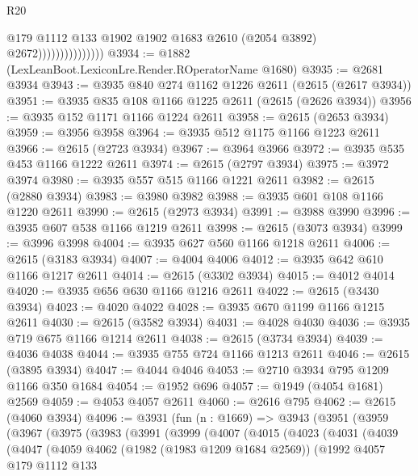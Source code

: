 \begin{lexlean}{R20}
\begin{coremodule}
                                  @179
                                  @1112
                                  @133
                                  @1902
                                  @1902
                                  @1683
                                  @2610
                                  (@2054 @3892)
                                  @2672)))))))))))))))
@3934 := @1882 (LexLeanBoot.LexiconLre.Render.ROperatorName @1680)
@3935 := @2681 @3934
@3943 := @3935 @840 @274 @1162 @1226 @2611 (@2615 (@2617 @3934))
@3951 := @3935 @835 @108 @1166 @1225 @2611 (@2615 (@2626 @3934))
@3956 := @3935 @152 @1171 @1166 @1224 @2611
@3958 := @2615 (@2653 @3934)
@3959 := @3956 @3958
@3964 := @3935 @512 @1175 @1166 @1223 @2611
@3966 := @2615 (@2723 @3934)
@3967 := @3964 @3966
@3972 := @3935 @535 @453 @1166 @1222 @2611
@3974 := @2615 (@2797 @3934)
@3975 := @3972 @3974
@3980 := @3935 @557 @515 @1166 @1221 @2611
@3982 := @2615 (@2880 @3934)
@3983 := @3980 @3982
@3988 := @3935 @601 @108 @1166 @1220 @2611
@3990 := @2615 (@2973 @3934)
@3991 := @3988 @3990
@3996 := @3935 @607 @538 @1166 @1219 @2611
@3998 := @2615 (@3073 @3934)
@3999 := @3996 @3998
@4004 := @3935 @627 @560 @1166 @1218 @2611
@4006 := @2615 (@3183 @3934)
@4007 := @4004 @4006
@4012 := @3935 @642 @610 @1166 @1217 @2611
@4014 := @2615 (@3302 @3934)
@4015 := @4012 @4014
@4020 := @3935 @656 @630 @1166 @1216 @2611
@4022 := @2615 (@3430 @3934)
@4023 := @4020 @4022
@4028 := @3935 @670 @1199 @1166 @1215 @2611
@4030 := @2615 (@3582 @3934)
@4031 := @4028 @4030
@4036 := @3935 @719 @675 @1166 @1214 @2611
@4038 := @2615 (@3734 @3934)
@4039 := @4036 @4038
@4044 := @3935 @755 @724 @1166 @1213 @2611
@4046 := @2615 (@3895 @3934)
@4047 := @4044 @4046
@4053 := @2710 @3934 @795 @1209 @1166 @350 @1684
@4054 := @1952 @696
@4057 := @1949 (@4054 @1681) @2569
@4059 := @4053 @4057 @2611
@4060 := @2616 @795
@4062 := @2615 (@4060 @3934)
@4096 := @3931
    (fun (n : @1669) =>
    @3943
      (@3951
        (@3959
          (@3967
            (@3975
              (@3983
                (@3991
                  (@3999
                    (@4007
                      (@4015
                        (@4023
                          (@4031
                            (@4039
                              (@4047
                                (@4059
                                  @4062
                                  (@1982 (@1983 @1209 @1684 @2569))
                                  (@1992
                                    @4057
                                    @179
                                    @1112
                                    @133

\end{coremodule}
\end{lexlean}
